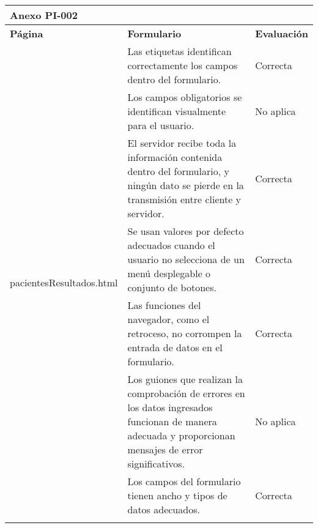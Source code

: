 \begin{table}[htpb]
\centering
\begin{tabularx}{\textwidth}{|l|X|l|}
\hline
\multicolumn{3}{|l|}{\textbf{Anexo PI-002}}                                                                                                                                                                                   \\ \hline
\textbf{Página}                            & \textbf{Formulario}                                                                                                                                       & \textbf{Evaluación} \\ \hline
\multirow{10}{*}{pacientesResultados.html} & Las etiquetas identifican correctamente los campos dentro del formulario.                                                                                 & Correcta            \\ \cline{2-3} 
                                           & Los campos obligatorios se identifican visualmente para el usuario.                                                                                       & No aplica           \\ \cline{2-3} 
                                           & El servidor recibe toda la información contenida dentro del formulario, y ningún dato se pierde en la transmisión entre cliente y servidor.               & Correcta            \\ \cline{2-3} 
                                           & Se usan valores por defecto adecuados cuando el usuario no selecciona de un menú desplegable o conjunto de botones.                                       & Correcta            \\ \cline{2-3} 
                                           & Las funciones del navegador, como el retroceso, no corrompen la entrada de datos en el formulario.                                                        & Correcta            \\ \cline{2-3} 
                                           & Los guiones que realizan la comprobación de errores en los datos ingresados funcionan de manera adecuada y proporcionan mensajes de error significativos. & No aplica           \\ \cline{2-3} 
                                           & Los campos del formulario tienen ancho y tipos de datos adecuados.                                                                                        & Correcta            \\ \cline{2-3} 

\end{tabularx}
\end{table}
